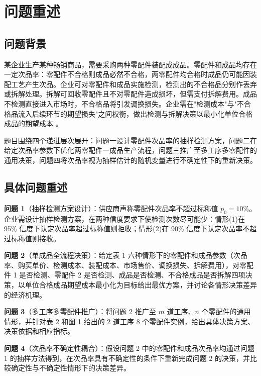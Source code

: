 \documentclass[12pt,a4paper]{ctexart}
\begin{document}
\section{问题重述}

\subsection{问题背景}

某企业生产某种畅销商品，需要采购两种零配件装配成成品。零配件和成品均存在一定次品率：零配件不合格则成品必然不合格，两零配件均合格时成品仍可能因装配工艺产生次品。企业可对零配件和成品实施检测，检测出的不合格品分别作丢弃或拆解处理。拆解可回收零配件且不对零配件造成损坏，但需支付拆解费用。成品不检测直接进入市场时，不合格品将引发调换损失。企业需在"检测成本"与"不合格品流入后续环节的期望损失"之间权衡，做出检测与拆解决策以最小化单位合格成品的期望成本 \cite{ref8}。

题目围绕四个递进层次展开：问题一设计零配件次品率的抽样检测方案，问题二在给定次品率参数下优化两零配件一成品生产流程，问题三推广至多工序多零配件的通用决策，问题四将次品率视为抽样估计的随机变量进行不确定性下的重新决策。

\subsection{具体问题重述}

\textbf{问题 1}（抽样检测方案设计）：供应商声称零配件次品率不超过标称值 $p_0=10\%$。企业需设计抽样检测方案，在两种信度要求下使检测次数尽可能少：情形(1)在 95\% 信度下认定次品率超过标称值则拒收；情形(2)在 90\% 信度下认定次品率不超过标称值则接收。

\textbf{问题 2}（单成品全流程决策）：给定表 1 六种情形下的零配件和成品参数（次品率、购买单价、检测成本、装配成本、市场售价、调换损失、拆解费用），对零配件 1 是否检测、零配件 2 是否检测、成品是否检测、不合格成品是否拆解四项决策，以单位合格成品期望成本最小化为目标给出最优方案，并讨论各情形决策差异的经济机理。

\textbf{问题 3}（多工序多零配件推广）：将问题 2 推广至 $m$ 道工序、$n$ 个零配件的通用情形，并针对表 2 和图 1 给出的 2 道工序 8 个零配件实例，给出具体决策方案、决策依据和相应指标。

\textbf{问题 4}（次品率不确定性耦合）：假设问题 2 中的零配件和成品次品率均通过问题 1 的抽样方法得到，在次品率具有不确定性的条件下重新完成问题 2 的决策，并比较确定性与不确定性情形下的决策差异。
\end{document}

